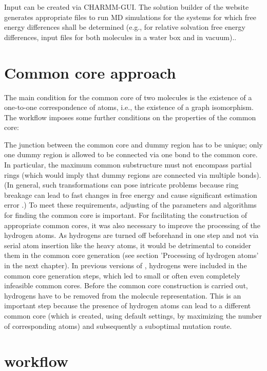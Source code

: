 Input can be created via CHARMM-GUI\cite{Jo.2008}. The solution builder of the website generates appropriate files to run MD simulations for the systems for which free energy differences shall be determined (e.g., for relative solvation free energy differences, input files for both molecules in a water box and in vacuum).\cite{Braunsfeld., Karwounopoulos.2022}.

\section{Common core approach}

The main condition for the common core of two molecules is the existence
of a one-to-one correspondence of atoms, i.e., the existence of a graph
isomorphism. The {\trafo} workflow imposes some further conditions
on the properties of the common core:

The junction between the common core and dummy region has to be unique;
only one dummy region is allowed to be connected via one bond to the
common core. In particular, the maximum common substructure must not
encompass partial rings (which would imply that dummy regions are
connected via multiple bonds). (In general, such transformations can pose intricate problems because ring breakage can lead to fast changes in free energy
and cause significant estimation error \cite{Liu.2015}.)
To meet these requirements, adjusting of the parameters and algorithms for finding the common core is important. For facilitating the construction of appropriate common cores, it was also necessary to improve the processing of the hydrogen atoms. As hydrogens are turned off beforehand in one step and not via serial atom insertion like the heavy atoms, it would be  detrimental to consider them in the common core generation (see section 'Processing of hydrogen atoms' in the next chapter). In previous versions of {\trafo}, hydrogens were included in the common core generation steps, which led to small or often even completely infeasible common cores. Before the common core construction is carried out, hydrogens have to be
removed from the molecule representation. This is an important step
because the presence of hydrogen atoms can lead to a different common
core (which is created, using default settings, by maximizing the
number of corresponding atoms) and subsequently a suboptimal mutation
route. 




\section{{\trafo} workflow}


